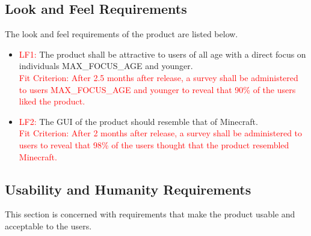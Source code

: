 \documentclass[12pt, titlepage]{article}
\begin{document}
\subsection{Look and Feel Requirements}
The look and feel requirements of the product are listed below.
\begin{itemize}
\item \textcolor{red}{LF1: }The product shall be attractive to users of all age with a direct focus on individuals MAX\_FOCUS\_AGE and younger.\\
\textcolor{red}{Fit Criterion: After 2.5 months after release, a survey shall be administered to users MAX\_FOCUS\_AGE and younger to reveal that 90\% of the users liked the product.}
\item \textcolor{red}{LF2: }The GUI of the product should resemble that of Minecraft.\\
\textcolor{red}{Fit Criterion: After 2 months after release, a survey shall be administered to users to reveal that 98\% of the users thought that the product resembled Minecraft.}
\end{itemize}

\subsection{Usability and Humanity Requirements}
This section is concerned with requirements that make the product usable and acceptable to the users.
\end{document}
